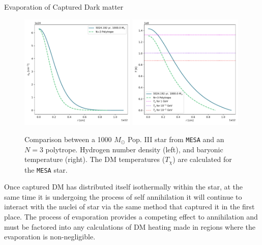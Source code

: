 \documentclass[a4paper,11pt]{article}
\begin{document}
\begin{section}{Evaporation of Captured Dark matter}
    \begin{figure}
        \centering
        \includegraphics[width=0.49\textwidth]{np.pdf}
        \includegraphics[width=0.49\textwidth]{Temp.pdf}
        \caption{Comparison between a 1000 $M_\odot$ Pop. III star from \texttt{MESA} and an $N=3$ polytrope.
        Hydrogen number density (left), and baryonic temperature (right).
        The DM temperatures ($T_\chi$) are calculated for the \texttt{MESA} star.}
        \label{MESAPOLY}
    \end{figure}
    Once captured DM has distributed itself isothermally within the star, at the same time it is undergoing the process of self annihilation it will continue to interact with the nuclei of star via the same method that captured it in the first place.
    The process of evaporation provides a competing effect to annihilation and must be factored into any calculations of DM heating made in regions where the evaporation is non-negligible.


\end{section}
\end{document}
